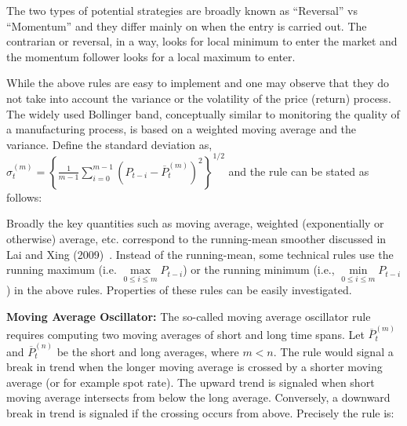 The two types of potential strategies are broadly known as ``Reversal'' vs ``Momentum'' and they differ mainly on when the entry is carried out. The contrarian or reversal, in a way, looks for local minimum to enter the market and the momentum follower looks for a local maximum to enter.


While the above rules are easy to implement and one may observe that they do not take into account the variance or the volatility of the price (return) process. The widely used Bollinger band, conceptually similar to monitoring the quality of a manufacturing process, is based on a weighted moving average and the variance. Define the standard deviation as, $\hat{\sigma}_{t}^{(m)} = \left\{ \frac{1}{m-1} \sum_{i=0}^{m-1} (P_{t-i} - \overline{P}_{t}^{(m)})^2 \right\}^{1/2}$ and the rule can be stated as follows: \medbreak


\begin{center}
\noindent{} 
\end{center} \twomedskip


Broadly the key quantities such as moving average, weighted (exponentially or otherwise) average, etc. correspond to the running-mean smoother discussed in Lai and Xing (2009)~\cite[Section 7.2.1]{lai1}. Instead of the running-mean, some technical rules use the running maximum (i.e. $\max\limits_{0 \leq i \leq m} P_{t-i}$) or the running minimum (i.e., $\min\limits_{0 \leq i \leq m} P_{t-i}$) in the above rules. Properties of these rules can be easily investigated. \twomedskip


\noindent\textbf{Moving Average Oscillator:} The so-called moving average oscillator rule requires computing two moving averages of short and long time spans. Let $\overline{P}_{t}^{(m)}$ and $\overline{P}_{t}^{(n)}$ be the short and long averages, where $m< n$. The rule would signal a break in trend when the longer moving average is crossed by a shorter moving average (or for example spot rate). The upward trend is signaled when short moving average intersects from below the long average. Conversely, a downward break in trend is signaled if the crossing occurs from above. Precisely the rule is: \medbreak


\begin{center}
\noindent{} 
\end{center} \twomedskip


